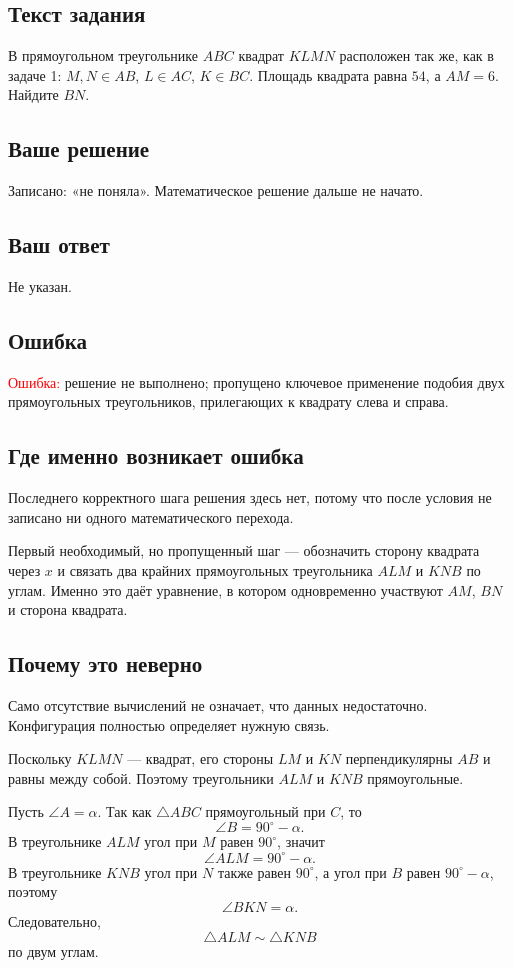 \documentclass[12pt,a4paper]{article}
\begin{document}
\subsection*{Текст задания}
В прямоугольном треугольнике $ABC$ квадрат $KLMN$ расположен так же, как в задаче 1: $M,N\in AB$, $L\in AC$, $K\in BC$. Площадь квадрата равна $54$, а $AM=6$. Найдите $BN$.

\subsection*{Ваше решение}
Записано: «не поняла». Математическое решение дальше не начато.

\subsection*{Ваш ответ}
Не указан.

\subsection*{Ошибка}
\textcolor{red}{Ошибка:} решение не выполнено; пропущено ключевое применение подобия двух прямоугольных треугольников, прилегающих к квадрату слева и справа.

\subsection*{Где именно возникает ошибка}
Последнего корректного шага решения здесь нет, потому что после условия не записано ни одного математического перехода.

Первый необходимый, но пропущенный шаг --- обозначить сторону квадрата через $x$ и связать два крайних прямоугольных треугольника $ALM$ и $KNB$ по углам. Именно это даёт уравнение, в котором одновременно участвуют $AM$, $BN$ и сторона квадрата.

\subsection*{Почему это неверно}
Само отсутствие вычислений не означает, что данных недостаточно. Конфигурация полностью определяет нужную связь.

Поскольку $KLMN$ --- квадрат, его стороны $LM$ и $KN$ перпендикулярны $AB$ и равны между собой. Поэтому треугольники $ALM$ и $KNB$ прямоугольные.

Пусть $\angle A=\alpha$. Так как $\triangle ABC$ прямоугольный при $C$, то
\[
\angle B=90^\circ-\alpha.
\]
В треугольнике $ALM$ угол при $M$ равен $90^\circ$, значит
\[
\angle ALM=90^\circ-\alpha.
\]
В треугольнике $KNB$ угол при $N$ также равен $90^\circ$, а угол при $B$ равен $90^\circ-\alpha$, поэтому
\[
\angle BKN=\alpha.
\]
Следовательно,
\[
\triangle ALM\sim\triangle KNB
\]
по двум углам.
\end{document}
